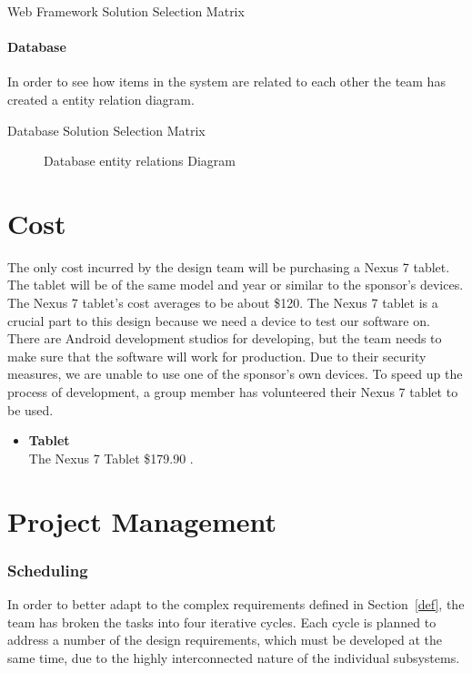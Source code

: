 \documentclass[Letter,11pt]{article}
\begin{document}
		
	
		\begin{table}[h]
			\centering
			
			\caption{\label{WebMatrix} Web Framework Solution Selection Matrix}
		\end{table}
	
	
	\subsection{Database}
		In order to see how items in the system are related to each other the team has created a entity relation diagram.
		\begin{table}[h]
			\centering
			
			\caption{\label{DBMatrix} Database Solution Selection Matrix}
		\end{table}
		
		\begin{figure}[h]
			\centering
			
			\caption{\label{ERdiogram} Database entity relations Diagram}
		\end{figure}
	

		
	
\part{Cost}

The only cost incurred by the design team will be purchasing a Nexus 7 tablet. The tablet will be of the same model and year or similar to the sponsor's devices. The Nexus 7 tablet's cost averages to be about \$120. The Nexus 7 tablet is a crucial part to this design because we need a device to test our software on. There are Android development studios for developing, but the team needs to make sure that the software will work for production.  Due to their security measures, we are unable to use one of the sponsor's own devices. To speed up the process of development, a group member has volunteered their Nexus 7 tablet to be used. \\
	    \begin{itemize}
	    \item \textbf{Tablet}\\
		    The Nexus 7 Tablet \$179.90 \cite{nexus7}.\\
		    \end{itemize}
\part{Project Management}
\section{Scheduling}
		In order to better adapt to the complex requirements defined in Section~\ref{def}, the team has broken the tasks into four iterative cycles. Each cycle is planned to address a number of the design requirements, which must be developed at the same time, due to the highly interconnected nature of the individual subsystems. 
		
\end{document}
